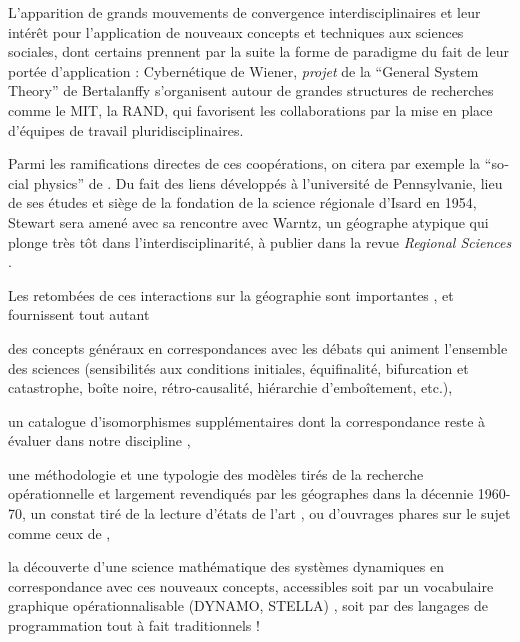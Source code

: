 L'apparition de grands mouvements de convergence interdisciplinaires et leur intérêt pour l'application de nouveaux concepts et techniques aux sciences sociales, dont certains prennent par la suite la forme de paradigme du fait de leur portée d'application : Cybernétique de Wiener, \textit{projet} de la \foreignquote{english}{General System Theory} de Bertalanffy \autocite[9]{Pouvreau2013} s'organisent autour de grandes structures de recherches comme le MIT, la RAND, qui favorisent les collaborations par la mise en place d'équipes de travail pluridisciplinaires.

Parmi les ramifications directes de ces coopérations, on citera par exemple la \foreignquote{english}{social physics} de \textcite{Stewart1947}. Du fait des liens développés à l'université de Pennsylvanie, lieu de ses études et siège de la fondation de la science régionale d'Isard en 1954, Stewart sera amené avec sa rencontre avec Warntz, un géographe atypique qui plonge très tôt dans l'interdisciplinarité, à publier dans la revue \textit{Regional Sciences} \autocite{Stewart1958}.

Les retombées de ces interactions sur la géographie sont importantes , et fournissent tout autant \begin{enumerate*}[label=(\alph*)] \item des concepts généraux en correspondances avec les débats qui animent l'ensemble des sciences (sensibilités aux conditions initiales, équifinalité, bifurcation et catastrophe, boîte noire, rétro-causalité, hiérarchie d'emboîtement, etc.), \item un catalogue d'isomorphismes  supplémentaires dont la correspondance reste à évaluer dans notre discipline \autocite{Wilson1969}, \item  une méthodologie et une typologie des modèles tirés de la recherche opérationnelle \autocite{Ackoff1962}  et largement revendiqués par les géographes dans la décennie 1960-70, un constat tiré de la lecture d'états de l'art \autocite{Kohn1970}, ou d'ouvrages phares sur le sujet comme ceux de \textcites{Berry1964a, Haggett1965}, \item la découverte d'une science mathématique des systèmes dynamiques en correspondance avec ces nouveaux concepts, accessibles soit par un vocabulaire graphique opérationnalisable (DYNAMO, STELLA) \autocite{Forrester1961}, soit par des langages de programmation tout à fait traditionnels \autocite[304-305]{Batty1976} ! \end{enumerate*}

